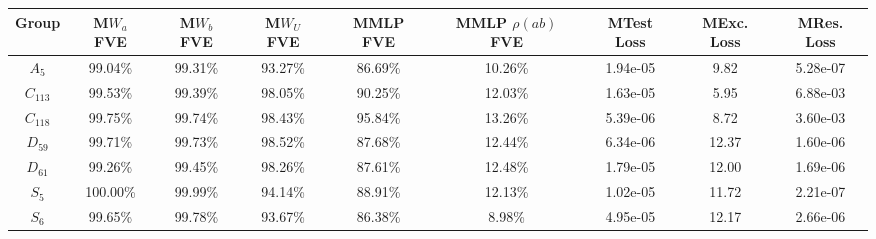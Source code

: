 \begin{tabular}{ccccccccc}
\toprule
    Group & M$W_a$ FVE & M$W_b$ FVE & M$W_U$ FVE & MMLP FVE & MMLP $\rho(ab)$ FVE & MTest Loss & MExc. Loss & MRes. Loss \\
\midrule
  $A_{5}$ &    99.04\% &    99.31\% &    93.27\% &  86.69\% &             10.26\% &   1.94e-05 &       9.82 &   5.28e-07 \\
$C_{113}$ &    99.53\% &    99.39\% &    98.05\% &  90.25\% &             12.03\% &   1.63e-05 &       5.95 &   6.88e-03 \\
$C_{118}$ &    99.75\% &    99.74\% &    98.43\% &  95.84\% &             13.26\% &   5.39e-06 &       8.72 &   3.60e-03 \\
 $D_{59}$ &    99.71\% &    99.73\% &    98.52\% &  87.68\% &             12.44\% &   6.34e-06 &      12.37 &   1.60e-06 \\
 $D_{61}$ &    99.26\% &    99.45\% &    98.26\% &  87.61\% &             12.48\% &   1.79e-05 &      12.00 &   1.69e-06 \\
  $S_{5}$ &   100.00\% &    99.99\% &    94.14\% &  88.91\% &             12.13\% &   1.02e-05 &      11.72 &   2.21e-07 \\
  $S_{6}$ &    99.65\% &    99.78\% &    93.67\% &  86.38\% &              8.98\% &   4.95e-05 &      12.17 &   2.66e-06 \\
\bottomrule
\end{tabular}
